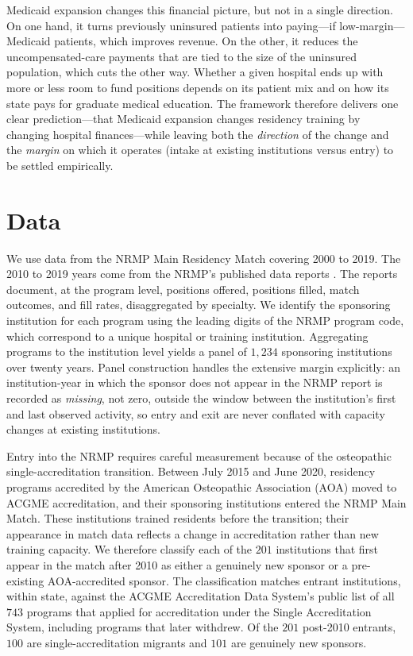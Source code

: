 Medicaid expansion changes this financial picture, but not in a single direction. On one hand, it turns previously uninsured patients into paying---if low-margin---Medicaid patients, which improves revenue. On the other, it reduces the uncompensated-care payments that are tied to the size of the uninsured population, which cuts the other way. Whether a given hospital ends up with more or less room to fund positions depends on its patient mix and on how its state pays for graduate medical education. The framework therefore delivers one clear prediction---that Medicaid expansion changes residency training by changing hospital finances---while leaving both the \emph{direction} of the change and the \emph{margin} on which it operates (intake at existing institutions versus entry) to be settled empirically.

\section{Data}\label{sec:data}

We use data from the NRMP Main Residency Match covering 2000 to 2019. The 2010 to 2019 years come from the NRMP's published data reports \autocite{nrmp2000, nrmp2001,nrmp2002, nrmp2003, nrmp2004, nrmp2005, nrmp2006, nrmp2007, nrmp2008, nrmp2009, nrmp2010, nrmp2011, nrmp2012, nrmp2013, nrmp2014, nrmp2015, nrmp2016, nrmp2017, nrmp2018, nrmp2019}. The reports document, at the program level, positions offered, positions filled, match outcomes, and fill rates, disaggregated by specialty. We identify the sponsoring institution for each program using the leading digits of the NRMP program code, which correspond to a unique hospital or training institution. Aggregating programs to the institution level yields a panel of $1{,}234$ sponsoring institutions over twenty years. Panel construction handles the extensive margin explicitly: an institution-year in which the sponsor does not appear in the NRMP report is recorded as \emph{missing}, not zero, outside the window between the institution's first and last observed activity, so entry and exit are never conflated with capacity changes at existing institutions.

Entry into the NRMP requires careful measurement because of the osteopathic single-accreditation transition. Between July 2015 and June 2020, residency programs accredited by the American Osteopathic Association (AOA) moved to ACGME accreditation, and their sponsoring institutions entered the NRMP Main Match. These institutions trained residents before the transition; their appearance in match data reflects a change in accreditation rather than new training capacity. We therefore classify each of the $201$ institutions that first appear in the match after 2010 as either a genuinely new sponsor or a pre-existing AOA-accredited sponsor. The classification matches entrant institutions, within state, against the ACGME Accreditation Data System's public list of all $743$ programs that applied for accreditation under the Single Accreditation System, including programs that later withdrew. Of the $201$ post-2010 entrants, $100$ are single-accreditation migrants and $101$ are genuinely new sponsors. 

